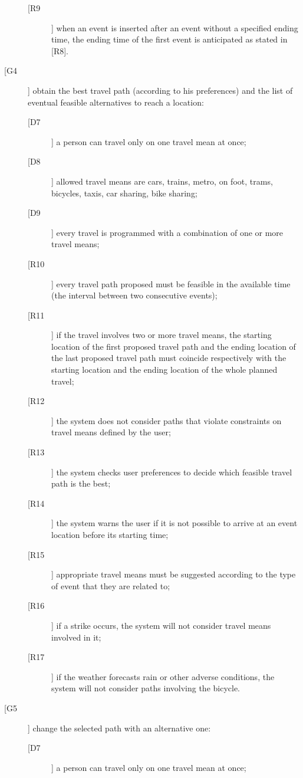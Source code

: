 \begin{description}
\begin{description}
	\item[[R9]] when an event is inserted after an event without a specified ending time, the ending time  of the first event is anticipated as stated in [R8].
	\end{description}
\item[[G4]] obtain the best travel path (according to his preferences) and the list of eventual feasible alternatives to reach a location:
	\begin{description}
	\item[[D7]] a person can travel only on one travel mean at once; 
	\item[[D8]] allowed travel means are cars, trains, metro, on foot, trams, bicycles, taxis, car sharing, bike sharing;
	\item[[D9]] every travel is programmed with a combination of one or more travel means;
	\newline
	\item[[R10]] every travel path proposed must be feasible in the available time (the interval between two consecutive events);
	\item[[R11]] if the travel involves two or more travel means, the starting location of the first proposed travel path and the ending location of the last proposed travel path must coincide respectively with the starting location and the ending location of the whole planned travel;
	\item[[R12]] the system does not consider paths that violate constraints on travel means defined by the user;
	\item[[R13]] the system checks user preferences to decide which feasible travel path is the best;
	\item[[R14]] the system warns the user if it is not possible to arrive at an event location before its starting time;
	\item[[R15]] appropriate travel means must be suggested according to the type of event that they are related to; 
	\item[[R16]] if a strike occurs, the system will not consider travel means involved in it;
	\item[[R17]] if the weather forecasts rain or other adverse conditions, the system will not consider paths involving the bicycle.
	\end{description}
\item[[G5]] change the selected path with an alternative one:
	\begin{description}
	\item[[D7]] a person can travel only on one travel mean at once; 

\end{description}
\end{description}
